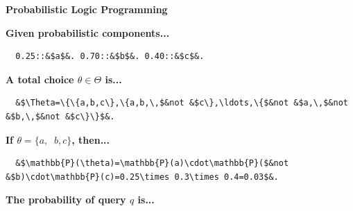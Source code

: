 \documentclass[aspectratio=169]{beamer}
\begin{document}
\begin{frame}[fragile]{\textbf{Probabilistic Logic Programming}}

{\bfseries\color{palette-orange}Given probabilistic components...}

\begin{verbatim}
  0.25::&$a$&. 0.70::&$b$&. 0.40::&$c$&.
\end{verbatim}
\pause%

\vspace{0.25cm}

{\bfseries\color{palette-orange}A total choice $\theta\in\Theta$ is...}

\vspace{0.1cm}

\begin{verbatim}
  &$\Theta=\{\{a,b,c\},\{a,b,\,$&not &$c\},\ldots,\{$&not &$a,\,$&not &$b,\,$&not &$c\}\}$&.
\end{verbatim}
\pause%

\vspace{0.25cm}

{\bfseries\color{palette-orange}If $\theta=\{a,\,$ $b,c\}$, then...}

\vspace{0.1cm}

\begin{verbatim}
  &$\mathbb{P}(\theta)=\mathbb{P}(a)\cdot\mathbb{P}($&not &$b)\cdot\mathbb{P}(c)=0.25\times 0.3\times 0.4=0.03$&.
\end{verbatim}
\pause%

\vspace{0.25cm}

{\bfseries\color{palette-orange}The probability of query $q$ is...}


\end{frame}

\end{document}
